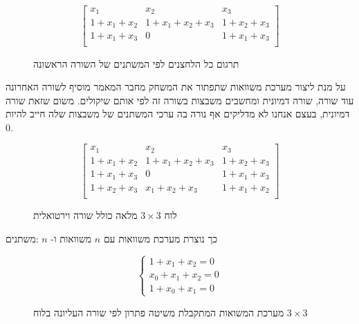 \documentclass[12pt,leqno]{article}
\theoremstyle{theoremdd}
\begin{document}
\begin{figure}[ht]
    \caption{
        תרגום כל הלחצנים לפי המשתנים של השורה הראשונה
    }
    \label{fig: 3 x 3 board fill intire board}
    \centering
    \[
    \begin{bmatrix}
        x_1 & x_2 & x_3 \\
        1 + x_1 + x_2 & 1 + x_1 + x_2 + x_3 & 1 + x_2 + x_3 \\
        1 + x_1 + x_3 & 0 & 1 + x_1 + x_3 \\
    \end{bmatrix}
    \]
\end{figure}

על מנת ליצור מערכת משוואות
שתפתור את המשחק
מחבר המאמר
\cite{B1}
מוסיף לשורה האחרונה עוד שורה, שורה דמיונית ומחשבים משבצות בשורה זה  
לפי אותם שיקולים.
משום שזאת שורה דמיונית, 
בעצם אנחנו לא מדליקים אף נורה בה ערכי המשתנים של משבצות
שלה חייב להיות
$0$.

\begin{figure}[ht]
    \caption{לוח 
    $3 \times 3$
    מלאה
    כולל שורה וירטואלית
    }
    \label{fig: 3 x 3 board fill with virtual}
    \centering
    \[
        \begin{bmatrix}
            x_1 & x_2 & x_3 \\
            1 + x_1 + x_2 & 1 + x_1 + x_2 + x_3 & 1 + x_2 + x_3 \\
            1 + x_1 + x_3 & 0 & 1 + x_1 + x_3 \\
            \hline
            1 + x_2 + x_3 & x_1 + x_2 + x_3 & 1 + x_1 + x_2 \\
        \end{bmatrix}
    \]
\end{figure}

כך נוצרת מערכת משוואות עם 
$n$
משוואות ו- 
$n$
:משתנים

\begin{figure}[ht]
    \caption{
        מערכת המשואות המתקבלת משיטה פתרון לפי שורה העליונה
        בלוח 
        $3 \times 3$
    }
    \label{fig: eq system for spanish method 3 x 3}
    
    \[\begin{cases}
        1+x_{1}+x_{2}=0\\
        x_0 + x_1 + x_2 = 0\\
        1 + x_0 + x_1 = 0
        \end{cases} \]
\end{figure}
\end{document}
